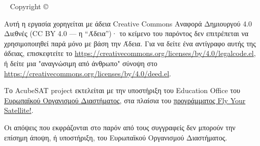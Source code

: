 \documentclass[a4paper,nobib]{tufte-book}
\begin{document}
\makeatother
\maketitle

\newpage
\begin{fullwidth}
~\vfill
\thispagestyle{empty}
\setlength{\parindent}{0pt}
\setlength{\parskip}{\baselineskip}
Copyright \copyright\ \the\year\ \thanklessauthor

\par{}

\par{}

\justify

\par Αυτή η εργασία χορηγείται με άδεια Creative Commons Αναφορά Δημιουργού 4.0 Διεθνές (CC BY 4.0 --- η ``Άδεια'')· το κείμενο του παρόντος δεν επιτρέπεται να χρησιμοποιηθεί παρά μόνο με βάση την Άδεια. Για να δείτε ένα αντίγραφο αυτής της άδειας, επισκεφτείτε το
\url{https://creativecommons.org/licenses/by/4.0/legalcode.el}, ή δείτε μια "αναγνώσιμη από άνθρωπο" σύνοψη στο \url{https://creativecommons.org/licenses/by/4.0/deed.el}.

\par Το AcubeSAT project εκτελείται με την υποστήριξη του Education Office του \href{https://www.esa.int/}{Ευρωπαϊκού Οργανισμού Διαστήματος}, στα πλαίσια του \href{https://www.esa.int/Education/CubeSats_-_Fly_Your_Satellite/}{προγράμματος Fly Your Satellite!}.

\par Οι απόψεις που εκφράζονται στο παρόν από τους συγγραφείς δεν μπορούν  την επίσημη άποψη, ή υποστήριξη, του Ευρωπαϊκού Οργανισμού Διαστήματος.

\par\textit{}
\end{fullwidth}

\tableofcontents
\end{document}
